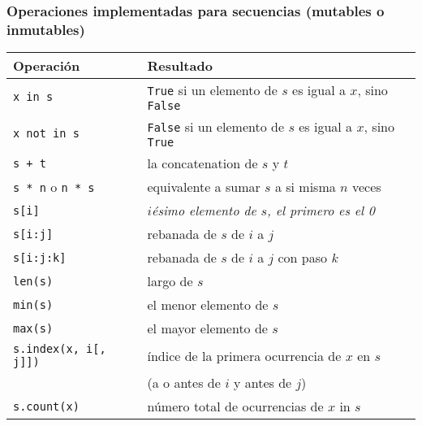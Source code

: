 \documentclass{beamer}
\begin{document}
\begin{frame}[fragile]
    \frametitle{Operaciones implementadas para secuencias (mutables o inmutables)}
{\small
    \begin{table}[]
    \begin{tabular}{@{}ll@{}}
    \toprule
    \textbf{Operación}           & \textbf{Resultado}                                                                  \\ \midrule
    \texttt{x in s}                        & \texttt{True} si un elemento de $s$ es igual a $x$, sino \texttt{False}                                  \\
    \texttt{x not in s}                   & \texttt{False} si un elemento de $s$ es igual a $x$, sino \texttt{True}                                   \\ \midrule
    \texttt{s + t}                        & la concatenation de $s$ y $t$                                                     \\ \midrule
    \texttt{s * n} o \texttt{n * s}  & equivalente a sumar $s$ a si misma $n$ veces                                         \\
    \texttt{s[i]}                     & \textit{$i$ésimo elemento de $s$, \alert{el primero es el 0}}                                                 \\
    \texttt{s[i:j]}                   & \alert{rebanada} de $s$ de $i$ a $j$                                                           \\
    \texttt{s[i:j:k]}                 & \alert{rebanada} de $s$ de $i$ a $j$ con paso $k$                                               \\
    \texttt{len(s)}                       & largo de $s$                                                                      \\
    \texttt{min(s)}                       & el menor elemento de $s$                                                               \\
    \texttt{max(s)}                       & el mayor elemento de $s$                                                                \\
    \texttt{s.index(x, i[, j]])} & índice de la primera ocurrencia de $x$ en $s$  \\
                                 & (a o antes de $i$ y antes de $j$) \\
    \texttt{s.count(x)}                   & número total de ocurrencias de $x$ in $s$                                            \\ \bottomrule
    \end{tabular}
    \end{table}
}
\end{frame}
\end{document}
